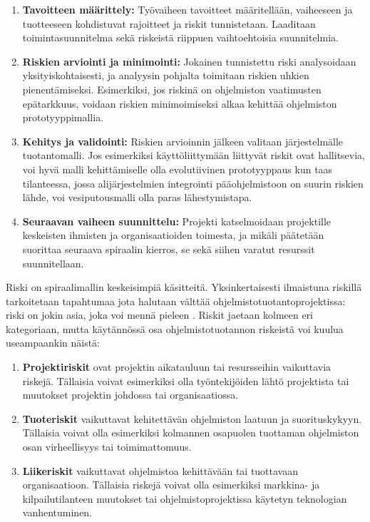 \documentclass[finnish,12pt]{tktltiki2}
\theoremstyle{definition}
\theoremstyle{remark}
\begin{document}
\begin{enumerate}
\item \textbf{Tavoitteen määrittely:} Työvaiheen tavoitteet määritellään, vaiheeseen ja tuotteeseen kohdistuvat rajoitteet ja riskit tunnistetaan. Laaditaan toimintasuunnitelma sekä riskeistä riippuen vaihtoehtoisia suunnitelmia.
\item \textbf{Riskien arviointi ja minimointi:} Jokainen tunnistettu riski analysoidaan yksityiskohtaisesti, ja analyysin pohjalta toimitaan riskien uhkien pienentämiseksi. Esimerkiksi, jos riskinä on ohjelmiston vaatimusten epätarkkuus, voidaan riskien minimoimiseksi alkaa kehittää ohjelmiston prototyyppimallia. 
\item \textbf{Kehitys ja validointi:} Riskien arvioinnin jälkeen valitaan järjestelmälle tuotantomalli. Jos esimerkiksi käyttöliittymään liittyvät riskit ovat hallitsevia, voi hyvä malli kehittämiselle olla evolutiivinen prototyyppaus kun taas tilanteessa, jossa alijärjestelmien integrointi pääohjelmistoon on suurin riskien lähde, voi vesiputousmalli olla paras lähestymistapa.
\item \textbf{Seuraavan vaiheen suunnittelu: } Projekti katselmoidaan projektille keskeisten ihmisten ja organisaatioiden toimesta, ja mikäli päätetään suorittaa seuraava spiraalin kierros, se sekä siihen varatut resurssit suunnitellaan.
\end{enumerate}

Riski on spiraalimallin keskeisimpiä käsitteitä. Yksinkertaisesti ilmaistuna riskillä tarkoitetaan tapahtumaa jota halutaan välttää ohjelmistotuotantoprojektissa: riski on jokin asia, joka voi mennä pieleen \cite{Sommerville10}. Riskit jaetaan kolmeen eri kategoriaan, mutta käytännössä osa ohjelmistotuotannon riskeistä voi kuulua useampaankin näistä:

\begin{enumerate}
\item \textbf{Projektiriskit} ovat projektin aikatauluun tai resursseihin vaikuttavia riskejä. Tällaisia voivat esimerkiksi olla työntekijöiden lähtö projektista tai muutokset projektin johdossa tai organisaatiossa.
\item \textbf{Tuoteriskit} vaikuttavat kehitettävän ohjelmiston laatuun ja suorituskykyyn. Tällaisia voivat olla esimerkiksi kolmannen osapuolen tuottaman ohjelmiston osan virheellisyys tai toimimattomuus.
\item \textbf{Liikeriskit} vaikuttavat ohjelmistoa kehittävään tai tuottavaan organisaatioon. Tällaisia riskejä voivat olla esimerkiksi markkina- ja kilpailutilanteen muutokset tai ohjelmistoprojektissa käytetyn teknologian vanhentuminen. 
\end{enumerate}
\end{document}
